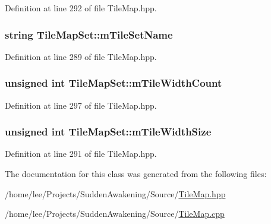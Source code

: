 Definition at line 292 of file Tile\-Map.\-hpp.

\hypertarget{class_tile_map_set_a355b36e8f407752bd128b2a7d8babbba}{
\subsubsection[{m\-Tile\-Set\-Name}]{\setlength{\rightskip}{0pt plus 5cm}string Tile\-Map\-Set\-::m\-Tile\-Set\-Name\hspace{0.3cm}{\ttfamily [protected]}}}\label{class_tile_map_set_a355b36e8f407752bd128b2a7d8babbba}


Definition at line 289 of file Tile\-Map.\-hpp.

\hypertarget{class_tile_map_set_a53e0c59bfbd6285e0b0ca8f79a4af02c}{
\subsubsection[{m\-Tile\-Width\-Count}]{\setlength{\rightskip}{0pt plus 5cm}unsigned int Tile\-Map\-Set\-::m\-Tile\-Width\-Count\hspace{0.3cm}{\ttfamily [protected]}}}\label{class_tile_map_set_a53e0c59bfbd6285e0b0ca8f79a4af02c}


Definition at line 297 of file Tile\-Map.\-hpp.

\hypertarget{class_tile_map_set_ad1dee478b0dd00ff72a6635fd068b8cb}{
\subsubsection[{m\-Tile\-Width\-Size}]{\setlength{\rightskip}{0pt plus 5cm}unsigned int Tile\-Map\-Set\-::m\-Tile\-Width\-Size\hspace{0.3cm}{\ttfamily [protected]}}}\label{class_tile_map_set_ad1dee478b0dd00ff72a6635fd068b8cb}


Definition at line 291 of file Tile\-Map.\-hpp.



The documentation for this class was generated from the following files\-:\begin{DoxyCompactItemize}
\item 
/home/lee/\-Projects/\-Sudden\-Awakening/\-Source/\hyperlink{_tile_map_8hpp}{Tile\-Map.\-hpp}\item 
/home/lee/\-Projects/\-Sudden\-Awakening/\-Source/\hyperlink{_tile_map_8cpp}{Tile\-Map.\-cpp}\end{DoxyCompactItemize}
